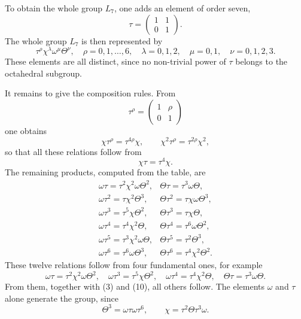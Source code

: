 \documentclass[11pt]{article}
\providecommand{\mat}[4]{\begin{pmatrix}#1&#2\\#3&#4\end{pmatrix}}
\providecommand{\mat}[4]{\begin{pmatrix}#1&#2\\#3&#4\end{pmatrix}}
\providecommand{\mat}[1]{\begin{pmatrix}#1\end{pmatrix}}
\begin{document}
To obtain the whole group $L_7$, one adds an element of order seven,
\begin{equation}
 \tau=\mat{1}{1}{0}{1}.
 \tag{7}
\end{equation}
The whole group $L_7$ is then represented by
\begin{equation}
 \tau^{\rho}\chi^{\lambda}\omega^{\mu}\Theta^{\nu},
 \quad \rho=0,1,\ldots,6,
 \quad \lambda=0,1,2,
 \quad \mu=0,1,
 \quad \nu=0,1,2,3.
 \tag{8}
\end{equation}
These elements are all distinct, since no non-trivial power of $\tau$ belongs to the octahedral subgroup.

It remains to give the composition rules. From
\begin{equation}
 \tau^{\rho}=\mat{1}{\rho}{0}{1}
 \tag{9}
\end{equation}
one obtains
\begin{equation}
 \chi\tau^{\rho}=\tau^{4\rho}\chi,
 \qquad
 \chi^2\tau^{\rho}=\tau^{2\rho}\chi^2,
 \tag{10}
\end{equation}
so that all these relations follow from
\begin{equation}
 \chi\tau=\tau^4\chi.
 \tag{11}
\end{equation}
The remaining products, computed from the table, are
\begin{equation}
\begin{array}{ll}
 \omega\tau=\tau^2\chi^2\omega\Theta^2,&
 \Theta\tau=\tau^3\omega\Theta,\\
 \omega\tau^2=\tau\chi^2\Theta^3,&
 \Theta\tau^2=\tau\chi\omega\Theta^3,\\
 \omega\tau^3=\tau^5\chi\Theta^2,&
 \Theta\tau^3=\tau\chi\Theta,\\
 \omega\tau^4=\tau^4\chi^2\Theta,&
 \Theta\tau^4=\tau^6\omega\Theta^2,\\
 \omega\tau^5=\tau^3\chi^2\omega\Theta,&
 \Theta\tau^5=\tau^2\Theta^3,\\
 \omega\tau^6=\tau^6\omega\Theta^3,&
 \Theta\tau^6=\tau^4\chi^2\Theta^2.
\end{array}
\tag{12}
\end{equation}
These twelve relations follow from four fundamental ones, for example
\begin{equation}
 \omega\tau=\tau^2\chi^2\omega\Theta^2,
 \quad
 \omega\tau^3=\tau^5\chi\Theta^2,
 \quad
 \omega\tau^4=\tau^4\chi^2\Theta,
 \quad
 \Theta\tau=\tau^3\omega\Theta.
 \tag{13}
\end{equation}
From them, together with (3) and (10), all others follow. The elements $\omega$ and $\tau$ alone generate the group, since
\begin{equation}
 \Theta^3=\omega\tau\omega\tau^6,
 \qquad
 \chi=\tau^2\Theta\tau^3\omega.
 \tag{14}
\end{equation}
\end{document}

